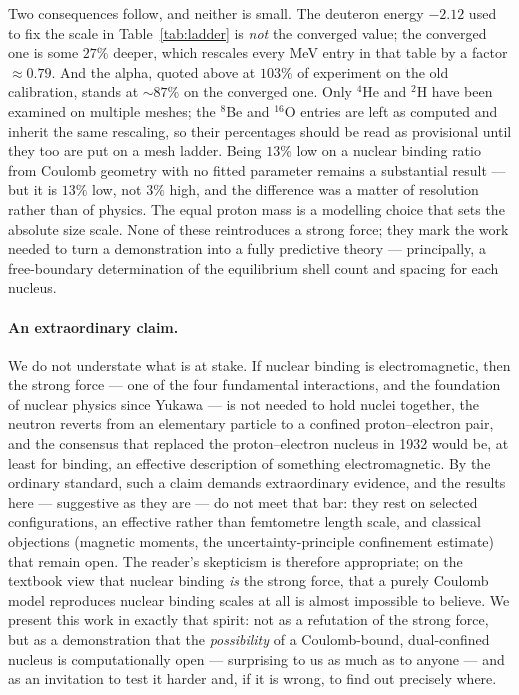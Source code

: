 \documentclass[11pt]{article}
\begin{document}
Two consequences follow, and neither is small. The deuteron energy $-2.12$ used to fix the scale in
Table~\ref{tab:ladder} is \emph{not} the converged value; the converged one is some $27\%$ deeper,
which rescales every MeV entry in that table by a factor ${\approx}0.79$. And the alpha, quoted
above at $103\%$ of experiment on the old calibration, stands at ${\sim}87\%$ on the converged one.
Only $^4$He and $^2$H have been examined on multiple meshes; the $^8$Be and $^{16}$O entries are
left as computed and inherit the same rescaling, so their percentages should be read as provisional
until they too are put on a mesh ladder. Being $13\%$ low on a nuclear binding ratio from Coulomb
geometry with no fitted parameter remains a substantial result --- but it is $13\%$ low, not $3\%$
high, and the difference was a matter of resolution rather than of physics. The equal proton mass is a
modelling choice that sets the absolute size scale. None of these reintroduces a strong force;
they mark the work needed to turn a demonstration into a fully predictive theory --- principally,
a free-boundary determination of the equilibrium shell count and spacing for each nucleus.

\paragraph{An extraordinary claim.} We do not understate what is at stake. If nuclear binding is
electromagnetic, then the strong force --- one of the four fundamental interactions, and the
foundation of nuclear physics since Yukawa --- is not needed to hold nuclei together, the neutron
reverts from an elementary particle to a confined proton--electron pair, and the consensus that
replaced the proton--electron nucleus in 1932 would be, at least for binding, an effective
description of something electromagnetic. By the ordinary standard, such a claim demands
extraordinary evidence, and the results here --- suggestive as they are --- do not meet that bar:
they rest on selected configurations, an effective rather than femtometre length scale, and
classical objections (magnetic moments, the uncertainty-principle confinement estimate) that
remain open. The reader's skepticism is therefore appropriate; on the textbook view that nuclear
binding \emph{is} the strong force, that a purely Coulomb model reproduces nuclear binding scales
at all is almost impossible to believe. We present this work in exactly that spirit: not as a
refutation of the strong force, but as a demonstration that the \emph{possibility} of a
Coulomb-bound, dual-confined nucleus is computationally open --- surprising to us as much as to
anyone --- and as an invitation to test it harder and, if it is wrong, to find out precisely where.
\end{document}

